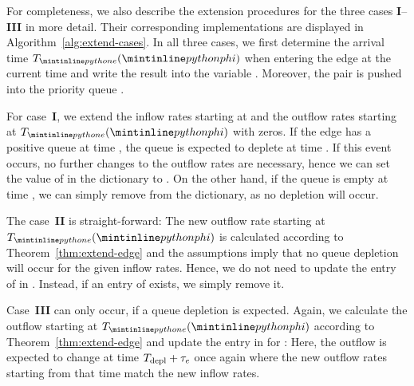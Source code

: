 For completeness, we also describe the extension procedures for the three cases \textbf{I}--\textbf{III} in more detail.
Their corresponding implementations are displayed in Algorithm~\ref{alg:extend-cases}.
In all three cases, we first determine the arrival time $T_{\code{e}}(\code{phi})$ when entering the edge at the current time  and write the result into the variable .
Moreover, the pair  is pushed into the priority queue .

For case~\textbf{I}, we extend the inflow rates starting at  and the outflow rates starting at $T_{\code{e}}(\code{phi})$ with zeros.
If the edge has a positive queue at time , the queue is expected to deplete at time .
If this event occurs, no further changes to the outflow rates are necessary, hence we can set the value of  in the dictionary  to .
On the other hand, if the queue is empty at time , we can simply remove  from the dictionary, as no depletion will occur.


The case~\textbf{II} is straight-forward:
The new outflow rate starting at $T_{\code{e}}(\code{phi})$ is calculated according to Theorem~\ref{thm:extend-edge} and the assumptions imply that no queue depletion will occur for the given inflow rates.
Hence, we do not need to update the entry of  in .
Instead, if an entry of  exists, we simply remove it.

Case~\textbf{III} can only occur, if a queue depletion is expected.
Again, we calculate the outflow starting at $T_{\code{e}}(\code{phi})$ according to Theorem~\ref{thm:extend-edge} and update the entry in  for :
Here, the outflow is expected to change at time $T_{\textnormal{depl}} + \tau_e$ once again where the new outflow rates starting from that time match the new inflow rates. 


